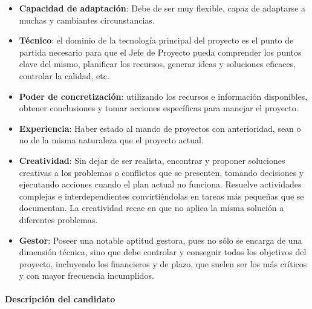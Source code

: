 \begin{itemize}
                \item \textbf{Capacidad de adaptación}:
                Debe de ser muy flexible, capaz de adaptarse a muchas y cambiantes circunstancias.
                
                \item \textbf{Técnico}:
                el dominio de la tecnología principal del proyecto es el punto de partida necesario para que el Jefe de Proyecto pueda comprender los puntos clave del mismo, planificar los recursos, generar ideas y soluciones eficaces, controlar la calidad, etc.
                                
                \item \textbf{Poder de concretización}:
                utilizando los recursos e información disponibles, obtener conclusiones y tomar acciones específicas para manejar el proyecto.
                                
                \item \textbf{Experiencia}:
                Haber estado al mando de proyectos con anterioridad, sean o no de la misma naturaleza que el proyecto actual.
                
                \item \textbf{Creatividad}:
                Sin dejar de ser realista, encontrar y proponer soluciones creativas a los problemas o conflictos que se presenten, tomando decisiones y ejecutando acciones cuando el plan actual no funciona.
                Resuelve actividades complejas e interdependientes convirtiéndolas en tareas más pequeñas que se documentan.
                La creatividad recae en que no aplica la misma solución a diferentes problemas.
                
                \item \textbf{Gestor}:
                Poseer una notable aptitud gestora, pues no sólo se encarga de una dimensión técnica, sino que debe controlar y conseguir todos los objetivos del proyecto, incluyendo los financieros y de plazo, que suelen ser los más críticos y con mayor frecuencia incumplidos.
			\end{itemize}



\paragraph{Descripción del candidato}


